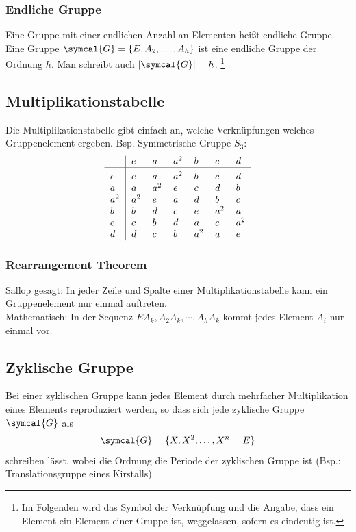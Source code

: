 \documentclass[
  captions=tableheading,  %
  titlepage=firstiscover, %
]{scrartcl}
\begin{document}
\subsubsection{Endliche Gruppe}
Eine Gruppe mit einer endlichen Anzahl an Elementen heißt endliche Gruppe.
Eine Gruppe $\symcal{G} = \{ E, A_2, \ldots, A_h \} $ ist eine endliche Gruppe der Ordnung $h$.
Man schreibt auch $|\symcal{G}| = h$.
\footnote{Im Folgenden wird das Symbol der Verknüpfung und die Angabe, dass ein Element ein Element
einer Gruppe ist, weggelassen, sofern es eindeutig ist.}
\subsection{Multiplikationstabelle}
Die Multiplikationstabelle gibt einfach an, welche Verknüpfungen welches Gruppenelement ergeben.
Bsp. Symmetrische Gruppe $S_3$:
\[
    \begin{tabular}{>{$}l<{$}|*{6}{>{$}l<{$}}}
    ~   & e   & a   & a^2 & b   & c   & d   \\
    \hline\vrule height 12pt width 0pt
    e   & e   & a   & a^2 & b   & c   & d   \\
    a   & a   & a^2 & e   & c   & d   & b   \\
    a^2 & a^2 & e   & a   & d   & b   & c   \\
    b   & b   & d   & c   & e   & a^2 & a   \\
    c   & c   & b   & d   & a   & e   & a^2 \\
    d   & d   & c   & b   & a^2 & a   & e   \\
    \end{tabular} 
\]
\subsubsection{Rearrangement Theorem}
Sallop gesagt: In jeder Zeile und Spalte einer Multiplikationstabelle kann ein Gruppenelement nur einmal auftreten.\\
Mathematisch: In der Sequenz $EA_k, A_2A_k, \cdots , A_h A_k$ kommt jedes Element $A_i$ nur einmal vor.
\subsection{Zyklische Gruppe}
Bei einer zyklischen Gruppe kann jedes Element durch mehrfacher Multiplikation eines Elements reproduziert werden, so dass
sich jede zyklische Gruppe $\symcal{G}$ als 
\begin{equation*}
  \symcal{G} = \{ X, X^2, \ldots, X^n = E \}
\end{equation*}
schreiben lässt, wobei die Ordnung die Periode der zyklischen Gruppe ist (Bsp.: Translationsgruppe eines Kirstalls)
\end{document}
